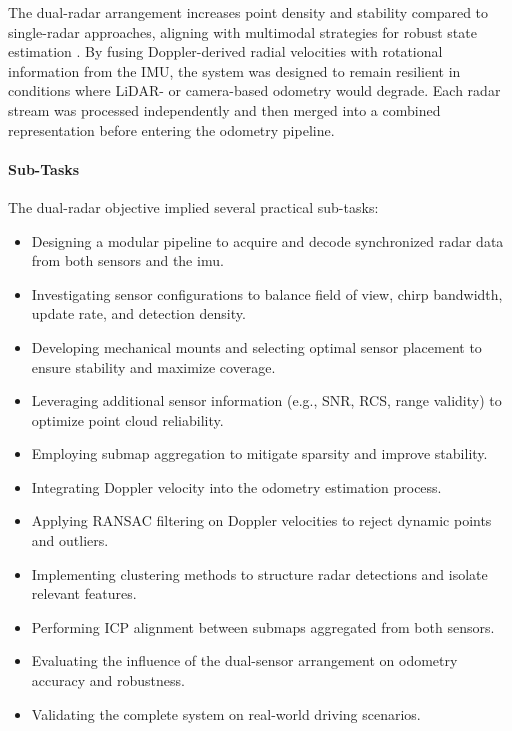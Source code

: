 \vspace{2\baselineskip}
The dual-radar arrangement increases point density and stability compared to single-radar approaches, aligning with multimodal strategies for robust state estimation \cite{Multimodal_Offroad,HighSpeed_Estimation}.  
By fusing Doppler-derived radial velocities with rotational information from the IMU, the system was designed to remain resilient in conditions where LiDAR- or camera-based odometry would degrade.  
Each radar stream was processed independently and then merged into a combined representation before entering the odometry pipeline.  

\vspace{1\baselineskip}
\paragraph*{Sub-Tasks}
The dual-radar objective implied several practical sub-tasks:  
\begin{itemize}
    \item Designing a modular pipeline to acquire and decode synchronized radar data from both sensors and the imu.  
    \item Investigating sensor configurations to balance field of view, chirp bandwidth, update rate, and detection density.  
    \item Developing mechanical mounts and selecting optimal sensor placement to ensure stability and maximize coverage.  
    \item Leveraging additional sensor information (e.g., SNR, RCS, range validity) to optimize point cloud reliability.  
    \item Employing submap aggregation to mitigate sparsity and improve stability.  
    \item Integrating Doppler velocity into the odometry estimation process.  
    \item Applying RANSAC filtering on Doppler velocities to reject dynamic points and outliers.  
    \item Implementing clustering methods to structure radar detections and isolate relevant features.  
    \item Performing ICP alignment between submaps aggregated from both sensors.  
    \item Evaluating the influence of the dual-sensor arrangement on odometry accuracy and robustness.  
    \item Validating the complete system on real-world driving scenarios.  
\end{itemize}


